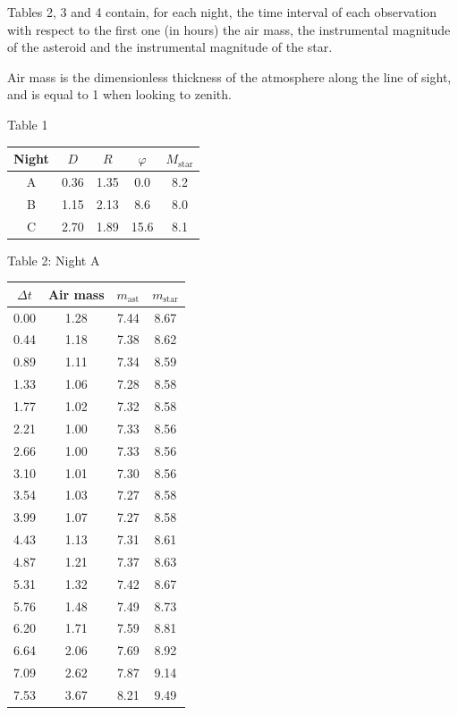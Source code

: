 Tables 2, 3 and 4 contain, for each night, the time interval of each
observation with respect to the first one (in hours) the air mass, the
instrumental magnitude of the asteroid and the instrumental magnitude of the
star.

Air mass is the dimensionless thickness of the atmosphere along the line of
sight, and is equal to 1 when looking to zenith.

\begin{center}
Table 1

\begin{tabular}{c|c|c|c|c}
Night & $D$ & $R$ & $\varphi$ & $M_{\mathrm{star}}$ \\
\hline
A & 0.36 & 1.35 & 0.0  & 8.2 \\
B & 1.15 & 2.13 & 8.6  & 8.0 \\
C & 2.70 & 1.89 & 15.6 & 8.1 \\
\end{tabular}
\end{center}

\begin{center}
Table 2: Night A

\begin{tabular}{c|c|c|c}
$\Delta t$ & Air mass & $m_{\mathrm{ast}}$ & $m_{\mathrm{star}}$ \\
\hline
0.00 & 1.28 & 7.44 & 8.67 \\
0.44 & 1.18 & 7.38 & 8.62 \\
0.89 & 1.11 & 7.34 & 8.59 \\
1.33 & 1.06 & 7.28 & 8.58 \\
1.77 & 1.02 & 7.32 & 8.58 \\
2.21 & 1.00 & 7.33 & 8.56 \\
2.66 & 1.00 & 7.33 & 8.56 \\
3.10 & 1.01 & 7.30 & 8.56 \\
3.54 & 1.03 & 7.27 & 8.58 \\
3.99 & 1.07 & 7.27 & 8.58 \\
4.43 & 1.13 & 7.31 & 8.61 \\
4.87 & 1.21 & 7.37 & 8.63 \\
5.31 & 1.32 & 7.42 & 8.67 \\
5.76 & 1.48 & 7.49 & 8.73 \\
6.20 & 1.71 & 7.59 & 8.81 \\
6.64 & 2.06 & 7.69 & 8.92 \\
7.09 & 2.62 & 7.87 & 9.14 \\
7.53 & 3.67 & 8.21 & 9.49 \\
\end{tabular}
\end{center}

